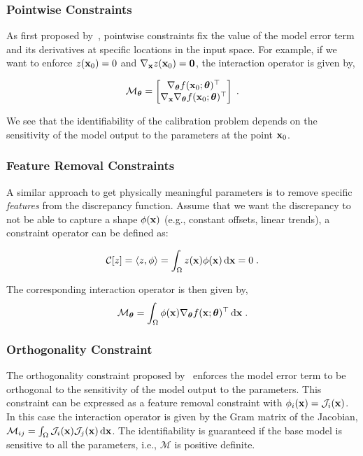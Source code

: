 \subsubsection{Pointwise Constraints}

As first proposed by~\cite{hagan_2014}, pointwise constraints fix the value of the model error term and its derivatives at specific locations in the input space. For example, if we want to enforce $z(\mathbf{x}_0) = 0$ and $\nabla_{\mathbf{x}} z(\mathbf{x}_0) = \mathbf{0}$, the interaction operator is given by,

\begin{equation}
    \mathcal{M}_{\boldsymbol{\theta}} = \begin{bmatrix} \nabla_{\boldsymbol{\theta}} f(\mathbf{x}_0; \boldsymbol{\theta})^\top \\ \nabla_{\mathbf{x}} \nabla_{\boldsymbol{\theta}} f(\mathbf{x}_0; \boldsymbol{\theta})^\top \end{bmatrix} \;.
\end{equation}

We see that the identifiability of the calibration problem depends on the sensitivity of the model output to the parameters at the point $\mathbf{x}_0$.

\subsubsection{Feature Removal Constraints} 
A similar approach to get physically meaningful parameters is to remove specific \textit{features} from the discrepancy function. Assume that we want the discrepancy to not be able to capture a shape $\phi(\mathbf{x})$ (e.g., constant offsets, linear trends), a constraint operator can be defined as:

\begin{equation}
    \mathcal{C}[z] = \langle z, \phi \rangle = \int_{\Omega} z(\mathbf{x}) \phi(\mathbf{x}) \, \text{d} \mathbf{x} = 0 \;.
    \label{eq:trend_removal_constraint}
\end{equation}

The corresponding interaction operator is then given by,
\begin{equation}
    \mathcal{M}_{\boldsymbol{\theta}} = \int_{\Omega} \phi(\mathbf{x}) \nabla_{\boldsymbol{\theta}} f(\mathbf{x}; \boldsymbol{\theta})^\top \, \text{d} \mathbf{x} \;.
\end{equation}

\subsubsection{Orthogonality Constraint}
The orthogonality constraint proposed by~\cite{Plumlee2017} enforces the model error term to be orthogonal to the sensitivity of the model output to the parameters. This constraint can be expressed as a feature removal constraint with $\phi_i(\mathbf{x}) = \mathcal{J}_i(\mathbf{x})$. In this case the interaction operator is given by the Gram matrix of the Jacobian, $\mathcal{M}_{ij} = \int_{\Omega} \mathcal{J}_i(\mathbf{x}) \mathcal{J}_j(\mathbf{x}) \, \text{d} \mathbf{x}$. The identifiability is guaranteed if the base model is sensitive to all the parameters, i.e., $\mathcal{M}$ is positive definite.

